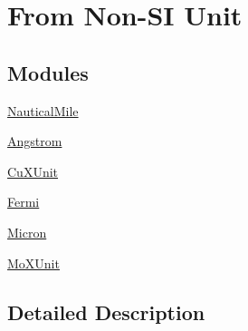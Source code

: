\hypertarget{group___e_g_x_math-_conversions-_length_conversions-_non-_s_i}{}\section{From Non-\/\+SI Unit}
\label{group___e_g_x_math-_conversions-_length_conversions-_non-_s_i}
\subsection*{Modules}
\begin{DoxyCompactItemize}
\item 
\mbox{\hyperlink{group___e_g_x_math-_conversions-_length_conversions-_non-_s_i-_nautical_mile}{Nautical\+Mile}}
\item 
\mbox{\hyperlink{group___e_g_x_math-_conversions-_length_conversions-_non-_s_i-_angstrom}{Angstrom}}
\item 
\mbox{\hyperlink{group___e_g_x_math-_conversions-_length_conversions-_non-_s_i-_cu_x_unit}{Cu\+X\+Unit}}
\item 
\mbox{\hyperlink{group___e_g_x_math-_conversions-_length_conversions-_non-_s_i-_fermi}{Fermi}}
\item 
\mbox{\hyperlink{group___e_g_x_math-_conversions-_length_conversions-_non-_s_i-_micron}{Micron}}
\item 
\mbox{\hyperlink{group___e_g_x_math-_conversions-_length_conversions-_non-_s_i-_mo_x_unit}{Mo\+X\+Unit}}
\end{DoxyCompactItemize}


\subsection{Detailed Description}
